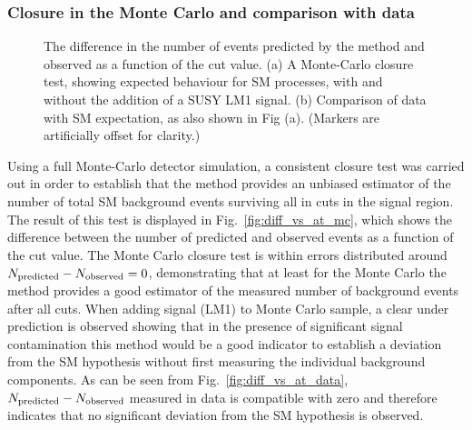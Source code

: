 \subsubsection{Closure in the Monte Carlo and comparison with data}
\begin{figure}[!t]
  \begin{center} 
    \caption{\label{fig:diff_vs_at} The difference in the number of
      events predicted by the method and observed as a function of the
      \aT cut value. (a) A Monte-Carlo closure test, showing expected
      behaviour for SM processes, with and without the addition of a SUSY LM1
      signal. (b) Comparison of data with SM expectation, as also
      shown in Fig (a). (Markers are artificially offset for clarity.)}
  \end{center}
\end{figure}

Using a full Monte-Carlo detector simulation, a consistent closure
test was carried out in order to establish that the method provides an
unbiased estimator of the number of total SM background events
surviving all in cuts in the signal region. The result of this test is
displayed in Fig.~\ref{fig:diff_vs_at_mc}, which shows the difference
between the number of predicted and observed events as a function of
the \aT cut value. The Monte Carlo closure test is within errors
distributed around $N_{\mathrm{predicted}} - N_{\mathrm{observed}} = 0$, demonstrating that at least
for the Monte Carlo the method provides a good estimator of the
measured number of background events after all cuts.  When adding
signal (LM1) to Monte Carlo sample, a clear under prediction is
observed showing that in the presence of significant signal
contamination this method would be a good indicator to establish a
deviation from the SM hypothesis without first measuring the
individual background components. As can be seen from
Fig.~\ref{fig:diff_vs_at_data}, $N_{\mathrm{predicted}} - N_{\mathrm{observed}}$ measured in data is
compatible with zero and therefore indicates that no significant
deviation from the SM hypothesis is observed.

